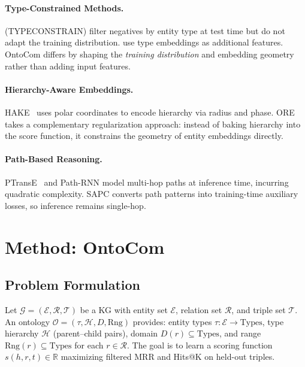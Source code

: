 \documentclass[10pt,twocolumn]{article}
\begin{document}
\paragraph{Type-Constrained Methods.}
\citet{ma2019jointly} (TYPECONSTRAIN) filter negatives by entity type at test time
but do not adapt the training distribution.
\citet{ko2022type} use type embeddings as additional features.
OntoCom differs by shaping the \emph{training distribution} and embedding geometry
rather than adding input features.

\paragraph{Hierarchy-Aware Embeddings.}
HAKE~\cite{zhang2020learning} uses polar coordinates to encode hierarchy via radius
and phase. ORE takes a complementary regularization approach: instead of baking
hierarchy into the score function, it constrains the geometry of entity embeddings
directly.

\paragraph{Path-Based Reasoning.}
PTransE~\cite{lin2015modeling} and Path-RNN model multi-hop paths at inference time,
incurring quadratic complexity. SAPC converts path patterns into training-time
auxiliary losses, so inference remains single-hop.

\section{Method: OntoCom}

\subsection{Problem Formulation}

Let $\mathcal{G} = (\mathcal{E}, \mathcal{R}, \mathcal{T})$ be a KG with entity
set $\mathcal{E}$, relation set $\mathcal{R}$, and triple set $\mathcal{T}$.
An ontology $\mathcal{O} = (\tau, \mathcal{H}, D, \text{Rng})$ provides: entity
types $\tau: \mathcal{E} \to \text{Types}$, type hierarchy $\mathcal{H}$
(parent--child pairs), domain $D(r) \subseteq \text{Types}$, and range
$\text{Rng}(r) \subseteq \text{Types}$ for each $r \in \mathcal{R}$.
The goal is to learn a scoring function $s(h, r, t) \in \mathbb{R}$ maximizing
filtered MRR and Hits@K on held-out triples.
\end{document}
